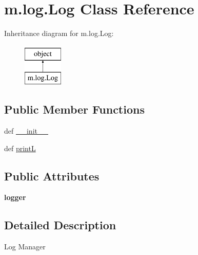 \hypertarget{classm_1_1log_1_1_log}{\section{m.\-log.\-Log Class Reference}
\label{classm_1_1log_1_1_log}
}
Inheritance diagram for m.\-log.\-Log\-:\begin{figure}[H]
\begin{center}
\leavevmode
\includegraphics[height=2.000000cm]{classm_1_1log_1_1_log}
\end{center}
\end{figure}
\subsection*{Public Member Functions}
\begin{DoxyCompactItemize}
\item 
def \hyperlink{classm_1_1log_1_1_log_a427aee1729c3bfbc0683753f2f5a5e8b}{\-\_\-\-\_\-init\-\_\-\-\_\-}
\item 
def \hyperlink{classm_1_1log_1_1_log_ae0287ddb37e9c5e3ac794a8ff7bbbe14}{print\-L}
\end{DoxyCompactItemize}
\subsection*{Public Attributes}
\begin{DoxyCompactItemize}
\item 
\hypertarget{classm_1_1log_1_1_log_a5459d297a6dbbd80ffd63adad30c6d9a}{{\bfseries logger}}\label{classm_1_1log_1_1_log_a5459d297a6dbbd80ffd63adad30c6d9a}

\end{DoxyCompactItemize}


\subsection{Detailed Description}
\begin{DoxyVerb}Log Manager
\end{DoxyVerb}
 

